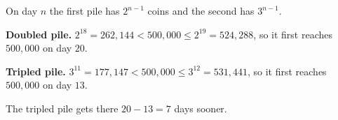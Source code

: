 On day $n$ the first pile has $2^{n-1}$ coins and the second has $3^{n-1}$.

\textbf{Doubled pile.} $2^{18}=262{,}144<500{,}000\le2^{19}=524{,}288$, so it first reaches $500{,}000$ on day $20$.

\textbf{Tripled pile.} $3^{11}=177{,}147<500{,}000\le3^{12}=531{,}441$, so it first reaches $500{,}000$ on day $13$.

The tripled pile gets there $20-13=\boxed{7}$ days sooner.
